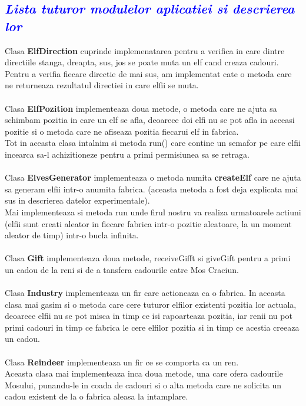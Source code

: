 \documentclass{article}
\begin{document}
\textcolor{blue}{\subsection{\itshape \textcolor{blue}{Lista tuturor modulelor aplicatiei si descrierea lor}}}
\vspace{7mm}
Clasa \textbf{ElfDirection} cuprinde implemenatarea pentru a verifica in care dintre directiile stanga, dreapta, sus, jos se poate muta un elf cand creaza cadouri.
Pentru a verifia fiecare directie de mai sus, am implementat cate o metoda care ne returneaza rezultatul directiei in care elfii se muta.\\\\
Clasa \textbf{ElfPozition} implementeaza doua metode, o metoda care ne ajuta sa schimbam pozitia in care un elf se afla, deoarece doi elfi nu se pot afla in aceeasi pozitie si o metoda care ne afiseaza pozitia fiecarui elf in fabrica.\\
Tot in aceasta clasa intalnim si metoda run() care contine un semafor pe care elfii incearca sa-l achizitioneze pentru a primi permisiunea sa se retraga.\\\\
Clasa \textbf{ElvesGenerator} implementeaza o metoda numita \textbf{createElf} care ne ajuta sa generam elfii intr-o anumita fabrica. (aceasta metoda a fost deja explicata mai sus in descrierea datelor experimentale).\\
Mai implementeaza si metoda run unde firul nostru va realiza urmatoarele actiuni (elfii sunt creati aleator in fiecare fabrica intr-o pozitie aleatoare, la un moment aleator de timp) intr-o bucla infinita.\\\\
Clasa \textbf{Gift} implementeaza doua metode, receiveGifft si giveGift pentru a primi un cadou de la reni si de a tansfera cadourile catre Mos Craciun.\\\\
Clasa \textbf{Industry} implementeaza un fir care actioneaza ca o fabrica. In aceasta clasa mai gasim si o metoda care cere tuturor elfilor existenti pozitia lor actuala, deoarece elfii nu se pot misca in timp ce isi rapoarteaza pozitia, iar renii nu pot primi cadouri in timp ce fabrica le cere elfilor pozitia si in timp ce acestia creeaza un cadou.\\\\
Clasa \textbf{Reindeer} implementeaza un fir ce se comporta ca un ren.\\
Aceasta clasa mai implementeaza inca doua metode, una care ofera cadourile Mosului, punandu-le in coada de cadouri si o alta metoda care ne solicita un cadou existent de la o fabrica aleasa la intamplare.\\\\
\end{document}
